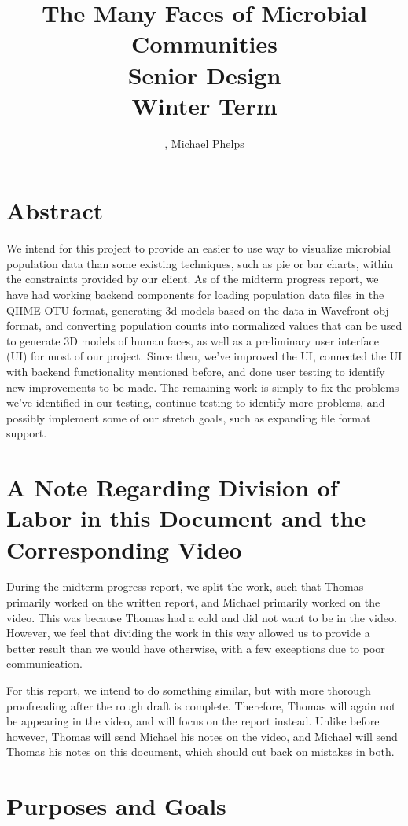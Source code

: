 \documentclass[letterpaper,10pt, onecolumn, draftclsnofoot]{IEEEtran}
\title{The Many Faces of Microbial Communities \\\large Senior Design\\Winter Term\\}
\author{\name, Michael Phelps}
\begin{document}
\maketitle
\section*{Abstract}
We intend for this project to provide an easier to use way to visualize microbial population data than some existing techniques, such as pie or bar charts, within the constraints provided by our client. As of the midterm progress report, we have had working backend components for loading population data files in the QIIME OTU format, generating 3d models based on the data in Wavefront obj format, and converting population counts into normalized values that can be used to generate 3D models of human faces, as well as a preliminary user interface (UI) for most of our project. Since then, we've improved the UI, connected the UI with backend functionality mentioned before, and done user testing to identify new improvements to be made. The remaining work is simply to fix the problems we've identified in our testing, continue testing to identify more problems, and possibly implement some of our stretch goals, such as expanding file format support.

\clearpage

\tableofcontents

\section{A Note Regarding Division of Labor in this Document and the Corresponding Video}
During the midterm progress report, we split the work, such that Thomas primarily worked on the written report, and Michael primarily worked on the video. This was because Thomas had a cold and did not want to be in the video. However, we feel that dividing the work in this way allowed us to provide a better result than we would have otherwise, with a few exceptions due to poor communication.

For this report, we intend to do something similar, but with more thorough proofreading after the rough draft is complete. Therefore, Thomas will again not be appearing in the video, and will focus on the report instead. Unlike before however, Thomas will send Michael his notes on the video, and Michael will send Thomas his notes on this document, which should cut back on mistakes in both.

\section{Purposes and Goals}
\end{document}
